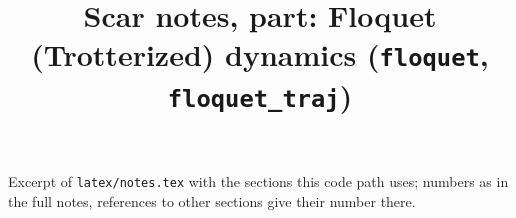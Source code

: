\documentclass[11pt,a4paper]{article}
\title{Scar notes, part: Floquet (Trotterized) dynamics (\texttt{floquet}, \texttt{floquet\_traj})}
\begin{document}
\maketitle
\noindent Excerpt of \texttt{latex/notes.tex} with the sections this code path uses; numbers as in the full notes, references to other sections give their number there.

\tableofcontents

\end{document}

